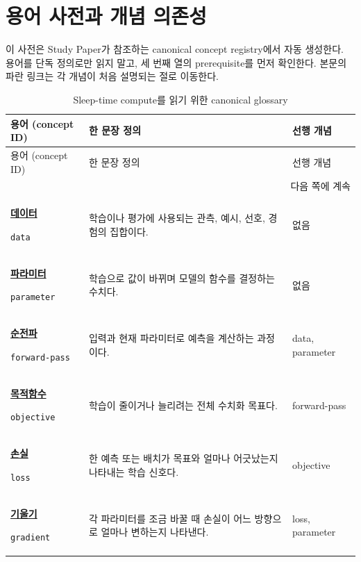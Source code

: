 \chapter*{용어 사전과 개념 의존성}
\setcounter{table}{0}
\renewcommand{\thetable}{G.\arabic{table}}
\label{bg:glossary}

이 사전은 Study Paper가 참조하는 canonical concept registry에서 자동 생성한다.
용어를 단독 정의로만 읽지 말고, 세 번째 열의 prerequisite를 먼저 확인한다.
본문의 파란 링크는 각 개념이 처음 설명되는 절로 이동한다.

\small
\begin{longtable}{p{} p{} p{}}
\caption{Sleep-time compute를 읽기 위한 canonical glossary}\label{tab:bg-glossary}\\
\toprule
용어 (concept ID) & 한 문장 정의 & 선행 개념 \\
\midrule
\endfirsthead
\toprule
용어 (concept ID) & 한 문장 정의 & 선행 개념 \\
\midrule
\endhead
\midrule\multicolumn{3}{r}{다음 쪽에 계속}\\
\endfoot
\bottomrule
\endlastfoot
\hypertarget{glossary:data}{\hyperref[bg:data]{\textbf{데이터}}} \newline\texttt{data} & 학습이나 평가에 사용되는 관측, 예시, 선호, 경험의 집합이다. & \scriptsize 없음 \\
\hypertarget{glossary:parameter}{\hyperref[bg:parameter]{\textbf{파라미터}}} \newline\texttt{parameter} & 학습으로 값이 바뀌며 모델의 함수를 결정하는 수치다. & \scriptsize 없음 \\
\hypertarget{glossary:forward-pass}{\hyperref[bg:forward-pass]{\textbf{순전파}}} \newline\texttt{forward-pass} & 입력과 현재 파라미터로 예측을 계산하는 과정이다. & \scriptsize data, parameter \\
\hypertarget{glossary:objective}{\hyperref[bg:objective]{\textbf{목적함수}}} \newline\texttt{objective} & 학습이 줄이거나 늘리려는 전체 수치화 목표다. & \scriptsize forward-pass \\
\hypertarget{glossary:loss}{\hyperref[bg:loss]{\textbf{손실}}} \newline\texttt{loss} & 한 예측 또는 배치가 목표와 얼마나 어긋났는지 나타내는 학습 신호다. & \scriptsize objective \\
\hypertarget{glossary:gradient}{\hyperref[bg:gradient]{\textbf{기울기}}} \newline\texttt{gradient} & 각 파라미터를 조금 바꿀 때 손실이 어느 방향으로 얼마나 변하는지 나타낸다. & \scriptsize loss, parameter \\

\end{longtable}
